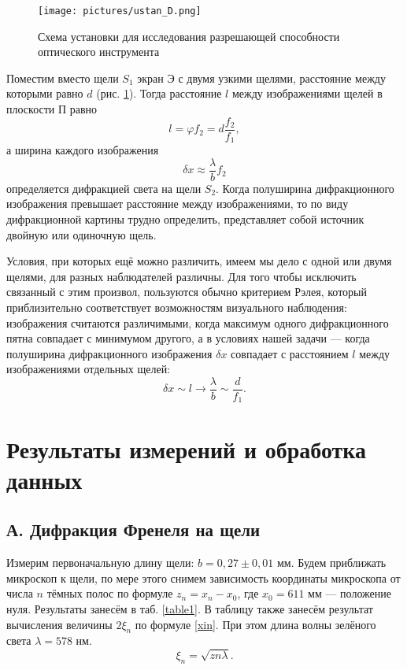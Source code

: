 \documentclass[a4paper,12pt]{article}
\begin{document}
\FloatBarrier
\begin{figure}[h]
	\centering
	\texttt{[image: pictures/ustan\_D.png]}
	\caption{Схема установки для исследования разрешающей
		способности оптического инструмента}
	\label{labG}
\end{figure}
\FloatBarrier

Поместим вместо щели $S_1$ экран Э с двумя узкими щелями, расстояние между которыми равно $d$ (рис. \ref{labG}). Тогда расстояние $l$ между изображениями щелей в плоскости П равно
\begin{equation}
l = \varphi f_2 = d \dfrac{f_2}{f_1},
\end{equation}
а ширина каждого изображения
\begin{equation}
\delta x \approx \dfrac{\lambda}{b} f_2
\end{equation}
определяется дифракцией света на щели $S_2$. Когда полуширина дифракционного изображения превышает расстояние между изображениями, то по виду дифракционной картины трудно определить, представляет собой источник двойную или одиночную щель.

Условия, при которых ещё можно различить, имеем мы дело с одной или двумя щелями, для разных наблюдателей различны. Для того чтобы исключить связанный с этим произвол, пользуются обычно критерием Рэлея, который приблизительно соответствует возможностям визуального наблюдения: изображения считаются различимыми, когда максимум одного дифракционного пятна совпадает с минимумом другого, а в условиях нашей задачи --- когда полуширина дифракционного изображения $\delta x$ совпадает с расстоянием $l$ между изображениями отдельных щелей:
\begin{equation}
\delta x \sim l \to \dfrac{\lambda}{b} \sim \dfrac{d}{f_1}.
\end{equation}





\section{Результаты измерений и обработка данных}


\subsection*{А. Дифракция Френеля на щели}

Измерим первоначальную длину щели: $ b = 0,27 \pm 0,01$ мм. Будем приближать микроскоп к щели, по мере этого снимем зависимость координаты микроскопа от числа $ n  $ тёмных полос по формуле $ z_n = x_n - x_0 $, где $ x_0 = 611 $ мм --- положение нуля. Результаты занесём в таб. \ref{table1}. В таблицу также занесём результат вычисления величины $ 2\xi_n $ по формуле \eqref{xin}. При этом длина волны зелёного света $ \lambda = 578  $ нм. 
\begin{equation}
\xi_n = \sqrt{zn\lambda}.
\end{equation}
\end{document}
